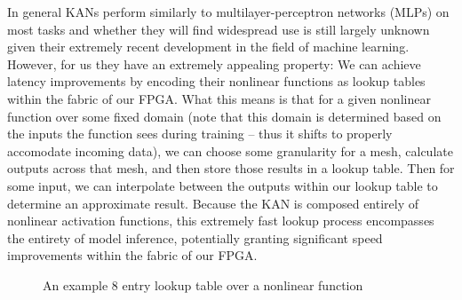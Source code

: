 \documentclass{article}
\begin{document}
In general KANs perform similarly to multilayer-perceptron networks (MLPs) on most tasks and whether they will find widespread use is still largely unknown given their extremely recent development in the field of machine learning. However, for us they have an extremely appealing property: We can achieve latency improvements by encoding their nonlinear functions as lookup tables within the fabric of our FPGA. What this means is that for a given nonlinear function over some fixed domain (note that this domain is determined based on the inputs the function sees during training -- thus it shifts to properly accomodate incoming data), we can choose some granularity for a mesh, calculate outputs across that mesh, and then store those results in a lookup table. Then for some input, we can interpolate between the outputs within our lookup table to determine an approximate result. Because the KAN is composed entirely of nonlinear activation functions, this extremely fast lookup process encompasses the entirety of model inference, potentially granting significant speed improvements within the fabric of our FPGA.

\begin{figure}[H]
{}
\caption{An example 8 entry lookup table over a nonlinear function}
\label{fig:lkup-diagram}
\end{figure}
\end{document}
